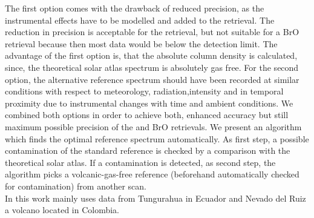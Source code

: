 The first option comes with the drawback of reduced precision, as the
instrumental effects have to be modelled and added to the retrieval. The reduction in precision is acceptable for the  retrieval, but not suitable for a BrO retrieval because then most data would be below the detection limit. The advantage of the first option is, that the absolute column density is calculated, since, the theoretical solar atlas spectrum is absolutely gas free. For the second option, the alternative reference spectrum should
have been recorded at similar conditions with respect to meteorology,
radiation,intensity and in temporal proximity due to instrumental changes
with time and ambient conditions. We combined both options in order to
achieve both, enhanced accuracy but still maximum possible precision of
the  and BrO retrievals. We present an algorithm which finds the
optimal reference spectrum automatically. As first step, a possible 
contamination of the standard reference is checked by a comparison with
the theoretical solar atlas. If a contamination is detected, as second step,
the algorithm picks a volcanic-gas-free reference (beforehand
automatically checked for contamination) from another scan.\\
%
\newline
%
In this work mainly uses data from Tungurahua in Ecuador and Nevado del Ruiz a volcano located in Colombia.